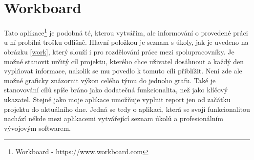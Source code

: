 \section{Workboard}

Tato aplikace\footnote{Workboard - https://www.workboard.com} je podobná té, kterou vytvářím, ale informování o provedené práci u ní probíhá trošku odlišně. Hlavní položkou je seznam s úkoly, jak je uvedeno na obrázku \ref{work}, který slouží i pro rozdělování práce mezi spolupracovníky. Je možné stanovit určitý cíl projektu, kterého chce uživatel dosáhnout a každý den vyplňovat informace, nakolik se mu povedlo k tomuto cíli přiblížit. Není zde ale možné graficky znázornit výkon celého týmu do jednoho grafu. Také je stanovování cílů spíše bráno jako dodatečná funkcionalita, než jako klíčový ukazatel. Stejně jako moje aplikace umožňuje vyplnit report jen od začátku projektu do aktuálního dne. Jedná se tedy o aplikaci, která se svojí funkcionalitou nachází někde mezi aplikacemi vytvářející seznam úkolů a profesionálním vývojovým softwarem. 

